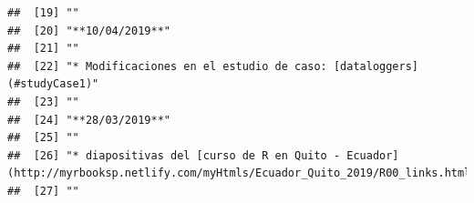 \documentclass[
]{book}
\begin{document}
\begin{verbatim}
##  [19] ""                                                                                                                                                                                                                                                                                                        
##  [20] "**10/04/2019**"                                                                                                                                                                                                                                                                                          
##  [21] ""                                                                                                                                                                                                                                                                                                        
##  [22] "* Modificaciones en el estudio de caso: [dataloggers](#studyCase1)"                                                                                                                                                                                                                                      
##  [23] ""                                                                                                                                                                                                                                                                                                        
##  [24] "**28/03/2019**"                                                                                                                                                                                                                                                                                          
##  [25] ""                                                                                                                                                                                                                                                                                                        
##  [26] "* diapositivas del [curso de R en Quito - Ecuador](http://myrbooksp.netlify.com/myHtmls/Ecuador_Quito_2019/R00_links.html)"                                                                                                                                                                              
##  [27] ""                                                                                                                                                                                                                                                                                                        

\end{verbatim}
\end{document}
